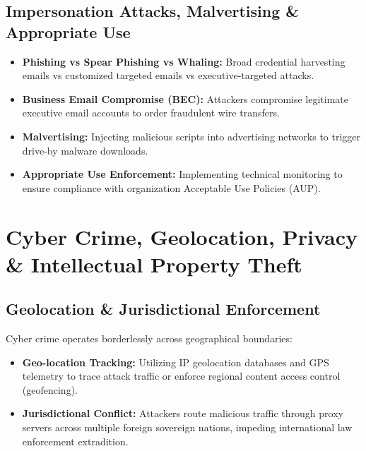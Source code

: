 \documentclass[12pt,a4paper]{article}
\begin{document}
\subsection{Impersonation Attacks, Malvertising \& Appropriate Use}
\begin{itemize}[leftmargin=*, itemsep=3pt]
  \item \textbf{Phishing vs Spear Phishing vs Whaling:} Broad credential harvesting emails vs customized targeted emails vs executive-targeted attacks.
  \item \textbf{Business Email Compromise (BEC):} Attackers compromise legitimate executive email accounts to order fraudulent wire transfers.
  \item \textbf{Malvertising:} Injecting malicious scripts into advertising networks to trigger drive-by malware downloads.
  \item \textbf{Appropriate Use Enforcement:} Implementing technical monitoring to ensure compliance with organization Acceptable Use Policies (AUP).
\end{itemize}

\section{Cyber Crime, Geolocation, Privacy \& Intellectual Property Theft}

\subsection{Geolocation \& Jurisdictional Enforcement}
Cyber crime operates borderlessly across geographical boundaries:
\begin{itemize}[leftmargin=*, itemsep=3pt]
  \item \textbf{Geo-location Tracking:} Utilizing IP geolocation databases and GPS telemetry to trace attack traffic or enforce regional content access control (geofencing).
  \item \textbf{Jurisdictional Conflict:} Attackers route malicious traffic through proxy servers across multiple foreign sovereign nations, impeding international law enforcement extradition.
\end{itemize}
\end{document}
